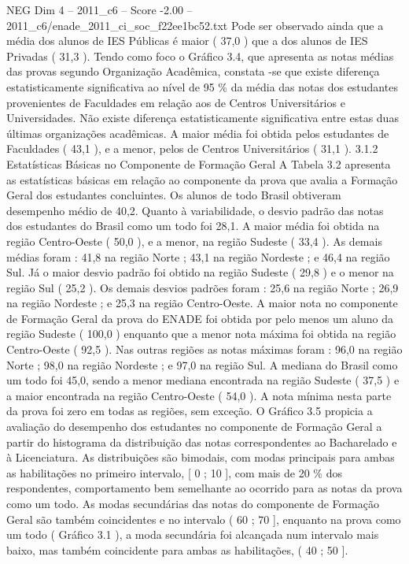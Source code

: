 \begin{textsample}{NEG Dim 4 – 2011\_c6 – Score -2.00 – 2011\_c6/enade\_2011\_ci\_soc\_f22ee1bc52.txt}
Pode ser observado ainda que a média dos alunos de IES Públicas é maior ( 37,0 ) que a dos alunos de IES Privadas ( 31,3 ).
Tendo como foco o Gráfico 3.4, que apresenta as notas médias das provas segundo Organização Acadêmica, constata -se que existe diferença estatisticamente significativa ao nível de 95 \% da média das notas dos estudantes provenientes de Faculdades em relação aos de Centros Universitários e Universidades.
Não existe diferença estatisticamente significativa entre estas duas últimas organizações acadêmicas.
A maior média foi obtida pelos estudantes de Faculdades ( 43,1 ), e a menor, pelos de Centros Universitários ( 31,1 ). 3.1.2 Estatísticas Básicas no Componente de Formação Geral A Tabela 3.2 apresenta as estatísticas básicas em relação ao componente da prova que avalia a Formação Geral dos estudantes concluintes.
Os alunos de todo Brasil obtiveram desempenho médio de 40,2.
Quanto à variabilidade, o desvio padrão das notas dos estudantes do Brasil como um todo foi 28,1.
A maior média foi obtida na região Centro-Oeste ( 50,0 ), e a menor, na região Sudeste ( 33,4 ).
As demais médias foram : 41,8 na região Norte ; 43,1 na região Nordeste ; e 46,4 na região Sul.
Já o maior desvio padrão foi obtido na região Sudeste ( 29,8 ) e o menor na região Sul ( 25,2 ).
Os demais desvios padrões foram : 25,6 na região Norte ; 26,9 na região Nordeste ; e 25,3 na região Centro-Oeste.
A maior nota no componente de Formação Geral da prova do ENADE foi obtida por pelo menos um aluno da região Sudeste ( 100,0 ) enquanto que a menor nota máxima foi obtida na região Centro-Oeste ( 92,5 ).
Nas outras regiões as notas máximas foram : 96,0 na região Norte ; 98,0 na região Nordeste ; e 97,0 na região Sul.
A mediana do Brasil como um todo foi 45,0, sendo a menor mediana encontrada na região Sudeste ( 37,5 ) e a maior encontrada na região Centro-Oeste ( 54,0 ).
A nota mínima nesta parte da prova foi zero em todas as regiões, sem exceção.
O Gráfico 3.5 propicia a avaliação do desempenho dos estudantes no componente de Formação Geral a partir do histograma da distribuição das notas correspondentes ao Bacharelado e à Licenciatura.
As distribuições são bimodais, com modas principais para ambas as habilitações no primeiro intervalo, [ 0 ; 10 ], com mais de 20 \% dos respondentes, comportamento bem semelhante ao ocorrido para as notas da prova como um todo.
As modas secundárias das notas do componente de Formação Geral são também coincidentes e no intervalo ( 60 ; 70 ], enquanto na prova como um todo ( Gráfico 3.1 ), a moda secundária foi alcançada num intervalo mais baixo, mas também coincidente para ambas as habilitações, ( 40 ; 50 ].

\end{textsample}
